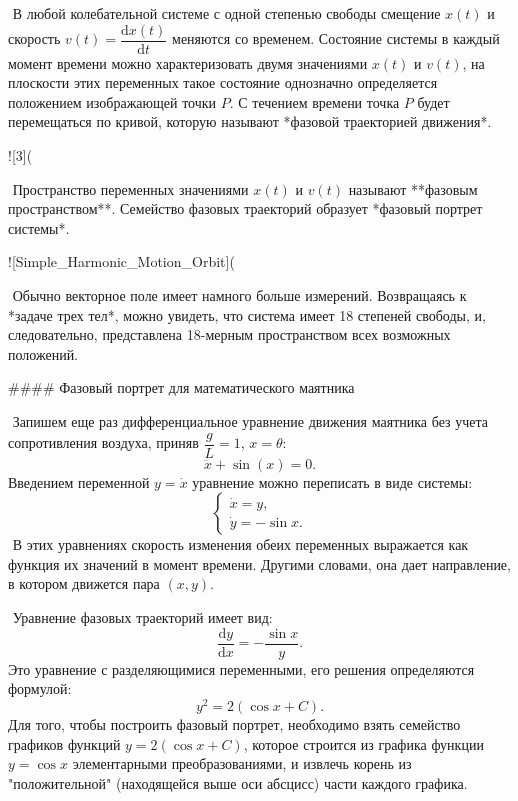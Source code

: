 ​	В любой колебательной системе с одной степенью свободы смещение $x(t)$ и скорость $v(t) = \dfrac{\mathrm{d}x(t)}{\mathrm{d}t}$ меняются со временем. Состояние системы в каждый момент времени можно характеризовать двумя значениями $x(t)$ и $v(t)$, на плоскости этих переменных такое состояние однозначно определяется положением изображающей точки $P$. С течением времени точка $P$ будет перемещаться по кривой, которую называют *фазовой траекторией движения*.

![3](%

​	Пространство переменных значениями $x(t)$ и $v(t)$ называют **фазовым пространством**. Семейство фазовых траекторий образует *фазовый портрет системы*.

![Simple_Harmonic_Motion_Orbit](%

​	Обычно векторное поле имеет намного больше измерений. Возвращаясь к *задаче трех тел*, можно увидеть, что система имеет 18 степеней свободы, и, следовательно, представлена 18-мерным пространством всех возможных положений.

#### Фазовый портрет для математического маятника

​	Запишем еще раз дифференциальное уравнение движения маятника без учета сопротивления воздуха, приняв $\dfrac{g}{L} = 1$, $x = \theta$:
$$
\ddot x +\sin(x) = 0.
$$
​	Введением переменной $y = \dot x$ уравнение можно переписать в виде системы:
$$
\begin{equation*}
 \begin{cases}
   \dot x = y, 
   \\
   \dot y = -\sin x.
 \end{cases}
\end{equation*}
$$
​	В этих уравнениях скорость изменения обеих переменных выражается как функция их значений в момент времени. Другими словами, она дает направление, в котором движется пара $(x, y)$.	

​	Уравнение фазовых траекторий имеет вид: 
$$
\frac{\mathrm{d}y}{\mathrm{d}x} = -\frac{\sin x}{y}.
$$
​	Это уравнение с разделяющимися переменными, его решения определяются формулой:
$$
y^2 = 2(\cos x + C).
$$
​	Для того, чтобы построить фазовый портрет, необходимо взять семейство графиков функций $y = 2(\cos x + C)$, которое строится из графика функции $y = \cos x$ элементарными преобразованиями, и извлечь корень из "положительной" (находящейся выше оси абсцисс) части каждого графика. 

